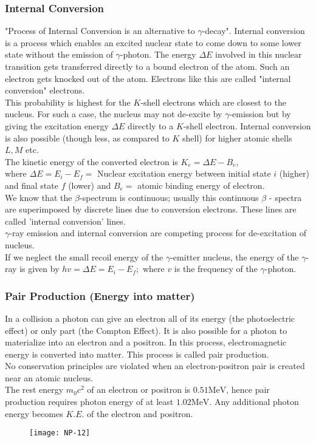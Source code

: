 \subsubsection{Internal Conversion}
"Process of Internal Conversion is an alternative to $\gamma$-decay". Internal conversion is a process which enables an excited nuclear state to come down to some lower state without the emission of $\gamma$-photon. The energy $\Delta E$ involved in this nuclear transition gets transferred directly to a bound electron of the atom. Such an electron gets knocked out of the atom. Electrons like this are called "internal conversion" electrons.\\
This probability is highest for the $K$-shell electrons which are closest to the nucleus. For such a case, the nucleus may not de-excite by $\gamma$-emission but by giving the excitation energy $\Delta E$ directly to a $K$-shell electron. Internal conversion is also possible (though less, as compared to $K$ shell) for higher atomic shells $L, M$ etc.\\
The kinetic energy of the converted electron is $K_e=\Delta E-B_e$,\\
where $\Delta E=E_i-E_f=$ Nuclear excitation energy between initial state $i$ (higher) and final state $f$ (lower) and $B_e=$ atomic binding energy of electron.\\
We know that the $\beta$-spectrum is continuous; usually this continuous $\beta$ - spectra are superimposed by discrete lines due to conversion electrons. These lines are called 'internal conversion' lines.\\
$\gamma$-ray emission and internal conversion are competing process for de-excitation of nucleus.\\
If we neglect the small recoil energy of the $\gamma$-emitter nucleus, the energy of the $\gamma$-ray is given by $h v=\Delta E=E_i-E_f ;$ where $v$ is the frequency of the $\gamma$-photon.
\subsubsection{Pair Production (Energy into matter)}
In a collision a photon can give an electron all of its energy (the photoelectric effect) or only part (the Compton Effect). It is also possible for a photon to materialize into an electron and a positron. In this process, electromagnetic energy is converted into matter. This process is called pair production.\\
No conservation principles are violated when an electron-positron pair is created near an atomic nucleus.\\
The rest energy $m_0 c^2$ of an electron or positron is $0.51 \mathrm{MeV}$, hence pair production requires photon energy of at least $1.02 \mathrm{MeV}$. Any additional photon energy becomes $K . E$. of the electron and positron.
\begin{figure}[H]
	\centering
	\texttt{[image: NP-12]}
	\caption{}
	\label{}
\end{figure}
